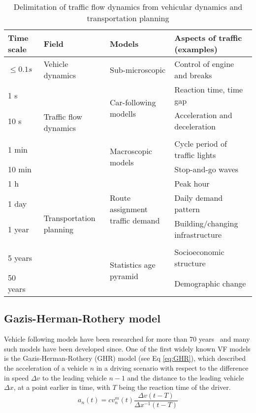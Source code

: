         \begin{table}[ht]
            \centering
            \begin{tabular}{p{.1\linewidth} p{.2\linewidth} p{.2\linewidth} p{.4\linewidth}}
                \hline
                Time scale & Field & Models & Aspects of traffic (examples) \\ \hline \hline
                $\le 0.1 s$ & Vehicle dynamics & Sub-microscopic & Control of engine and breaks \\ \hline
                1 s & \multirow{4}{\linewidth}{Traffic flow dynamics}&\multirow{2}{\linewidth}{Car-following modells} & Reaction time, time gap \\
                10 s & & & Acceleration and deceleration \\\\
                1 min& & \multirow{2}{\linewidth}{Macroscopic models} & Cycle period of traffic lights \\
                10 min & & & Stop-and-go waves \\ \hline
                1 h & \multirow{5}{\linewidth}{Transportation planning} & \multirow{3}{\linewidth}{Route assignment traffic demand} & Peak hour \\
                1 day & & & Daily demand pattern \\
                1 year & & & Building/changing infrastructure \\\\
                5 years & &  \multirow{2}{\linewidth}{Statistics age pyramid} & Socioeconomic structure \\
                50 years & & & Demographic change \\ \hline

            \end{tabular}
            \caption{Delimitation of traffic flow dynamics from vehicular dynamics and transportation planning\cite{treiber2013traffic}}
            \label{tab:dilimination-of-traffic-flow-dynamics}
        \end{table}

        \subsection{Gazis-Herman-Rothery model}\label{subsec:gazis-herman-rothery-model}
            Vehicle following models have been researched for more than 70 years~\cite{pipes1953operational} and many such models have been developed since.
            One of the first widely known VF models is the Gazis-Herman-Rothery (GHR) model (see Eq \ref{eq:GHR}), which described the acceleration of a vehicle $n$ in a driving scenario with respect to the difference in speed $\Delta v$ to the leading vehicle $n-1$ and the distance to the leading vehicle $\Delta x$, at a point earlier in time, with $T$ being the reaction time of the driver\cite{Brackstone1999}.
            \begin{equation}
                a_n(t) = c v_n^m(t) \frac{\Delta v (t-T)}{\Delta x^{-1} (t-T)} \label{eq:GHR}
            \end{equation}

